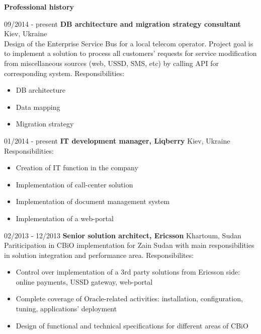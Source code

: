 \documentclass[10pt,a4paper]{extbook}
\begin{document}
\vspace{2mm}
{\large \textbf {Professional history}\par}

\vspace{2mm}
09/2014 - present \hspace{10mm} \textbf{DB architecture and migration strategy consultant} \hfill Kiev, Ukraine \\
Design of the Enterprise Service Bus for a local telecom operator. Project goal is to implement a solution to process all customers' requests for service modification from miscellaneous sources (web, USSD, SMS, etc) by calling API for corresponding system. Responsibilities:
\begin{itemize}[noitemsep,topsep=3mm,parsep=0pt,partopsep=0pt,itemindent=0pt,leftmargin=4mm]
\item DB architecture
\item Data mapping
\item Migration strategy
\end{itemize}

\par\vspace{5mm}
01/2014 -  present \hspace{10mm}\textbf{IT development manager, Liqberry} \hfill Kiev, Ukraine \\
Responsibilities:
\begin{itemize}[noitemsep,topsep=1mm,parsep=0pt,partopsep=0pt,itemindent=0pt,leftmargin=4mm]
\item Creation of IT function in the company
\item Implementation of call-center solution
\item Implementation of document management system
\item Implementation of a web-portal
\end{itemize}

\par\vspace{5mm}
02/2013 - 12/2013 \hspace{10mm}\textbf{Senior solution architect, Ericsson} \hfill Khartoum, Sudan \\
Pariticipation in CBiO implementation for Zain Sudan with main responsibilities in solution integration and performance area. Responsibilites: 
\begin{itemize}[noitemsep,topsep=1mm,parsep=0pt,partopsep=0pt,itemindent=0pt,leftmargin=4mm]
\item Control over implementation of a 3rd party solutions from Ericsson side: online payments, USSD gateway, web-portal
\item Complete coverage of Oracle-related activities: installation, configuration, tuning, applications' deployment
\item Design of functional and technical specifications for different areas of CBiO
\end{itemize}
\end{document}

